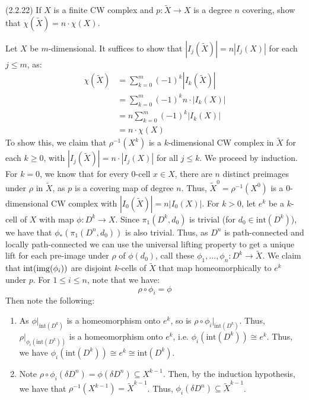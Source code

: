 \documentclass[12pt]{article}
\begin{document}
\begin{problem}{4}(2.2.22) 
    If $X$ is a finite CW complex and $p \colon \widetilde{X} \to X$ is a degree $n$ covering, show that $\chi(\widetilde{X}) = n \cdot \chi(X)$. 
\end{problem}
\begin{solution}
    Let $X$ be $m$-dimensional. It suffices to show that $|I_j(\widetilde{X})| = n |I_j(X)|$ for each $j \leq m$, as: 
    \begin{align*}
    \chi(\widetilde{X}) &= \sum_{k=0}^m (-1)^k |I_k(\widetilde{X})| \\
    &= \sum_{k=0}^m (-1)^k n \cdot |I_k(X)| \\
    &= n \sum_{k=0}^m (-1)^k |I_k(X)| \\
    &= n \cdot \chi(X)
    \end{align*}
    To show this, we claim that $\rho^{-1}(X^{k})$ is a $k$-dimensional CW complex in $\widetilde{X}$ for each $k \geq 0$, with $|I_j(\widetilde X)| = n \cdot |I_j(X)|$ for all $j \leq k$. We proceed by induction. \bbni
    For $k = 0$, we know that for every $0$-cell $x \in X$, there are $n$ distinct preimages under $\rho$ in $\widetilde{X}$, as $p$ is a covering map of degree $n$. Thus, $\widetilde{X}^0 = \rho^{-1}(X^0)$ is a $0$-dimensional CW complex with $|I_0(\widetilde{X})| = n |I_0(X)|$. \bbni
    For $k > 0$, let $e^k$ be a $k$-cell of $X$ with map $\phi: D^k \to X$. Since $\pi_1(D^k, d_0)$ is trivial (for $d_0 \in \text{int}(D^k)$), we have that $\phi_{*}(\pi_1(D^n, d_0))$ is also trivial. Thus, as $D^n$ is path-connected and locally path-connected we can use the universal lifting property to get a unique lift for each pre-image under $\rho$ of $\phi(d_0)$, call these $\phi_1, \ldots, \phi_n: D^k \to \widetilde{X}$. We claim that $\text{int}(\operatorname{img}(\phi_i))$ are disjoint $k$-cells of $\widetilde{X}$ that map homeomorphically to $e^k$ under $p$. \bbni
    For $1 \leq i \leq n$, note that we have: 
    \[ \rho \circ \phi_i = \phi\]
    Then note the following:
    \begin{enumerate}
        \item As $\phi|_{\text{int}(D^k)}$ is a homeomorphism onto $e^k$, so is $\rho \circ \phi_i|_{\text{int}(D^k)}$. Thus, $\rho|_{\phi_i(\text{int}(D^k))}$ is a homeomorphism onto $e^k$, i.e. $\phi_i(\text{int}(D^k)) \cong e^k$. Thus, we have $\phi_i(\text{int}(D^k)) \cong e^k \cong \text{int}(D^k)$.
        \item Note $\rho \circ \phi_i(\delta D^n) = \phi(\delta D^n) \subseteq X^{k-1}$. Then, by the induction hypothesis, we have that $\rho^{-1}(X^{k-1}) = \widetilde{X}^{k-1}$. Thus, $\phi_i(\delta D^n) \subseteq \widetilde{X}^{k-1}$. 

\end{enumerate}
\end{solution}
\end{document}
